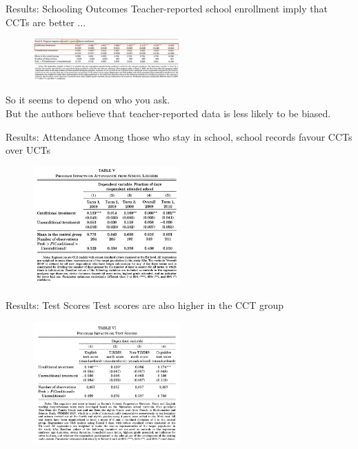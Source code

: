 \documentclass[11pt,notes=hide,aspectratio=169,mathserif]{beamer}
\begin{document}
\begin{frame}{Results: Schooling Outcomes}
Teacher-reported school enrollment imply that CCTs are better ...
\begin{figure}
\centering
\includegraphics[width=0.5\textwidth]{inputs/table7.png}
\end{figure}
\pause So it seems to depend on who you ask. \\
\pause But the authors believe that teacher-reported data is less likely to be biased. 
\end{frame}

\begin{frame}{Results: Attendance}
Among those who stay in school, school records favour CCTs over UCTs
\begin{figure}
\centering
\includegraphics[width=0.5\textwidth]{inputs/table8.png}
\end{figure}
\end{frame}

\begin{frame}{Results: Test Scores}
Test scores are also higher in the CCT group
\begin{figure}
\centering
\includegraphics[width=0.5\textwidth]{inputs/table9.png}
\end{figure}
\end{frame}
\end{document}

